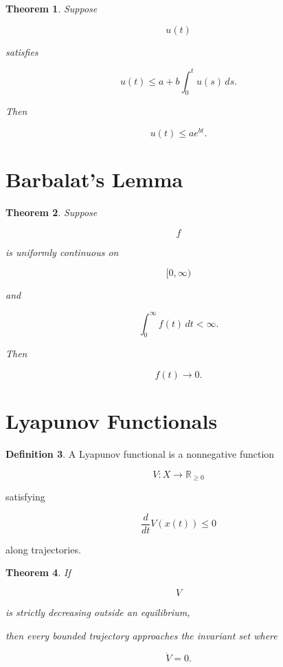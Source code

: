 \documentclass[11pt]{book}
\numberwithin{equation}{chapter}
\theoremstyle{definition}
\newtheorem{definition}{Definition}[chapter]
\theoremstyle{plain}
\newtheorem{theorem}[definition]{Theorem}
\begin{document}
\begin{theorem}

Suppose

\[
u(t)
\]

satisfies

\[
u(t)
\le
a
+
b
\int_0^t
u(s)\,ds.
\]

Then

\[
u(t)
\le
ae^{bt}.
\]

\end{theorem}


\section{Barbalat's Lemma}

\begin{theorem}

Suppose

\[
f
\]

is uniformly continuous on

\[
[0,\infty)
\]

and

\[
\int_0^\infty
f(t)\,dt
<
\infty.
\]

Then

\[
f(t)
\rightarrow
0.
\]

\end{theorem}


\section{Lyapunov Functionals}

\begin{definition}

A Lyapunov functional is a nonnegative function

\[
V:X\rightarrow\mathbb R_{\ge0}
\]

satisfying

\[
\frac{d}{dt}
V(x(t))
\le0
\]

along trajectories.

\end{definition}


\begin{theorem}

If

\[
V
\]

is strictly decreasing outside an equilibrium,

then every bounded trajectory approaches the invariant set where

\[
\dot V=0.
\]

\end{theorem}
\end{document}
